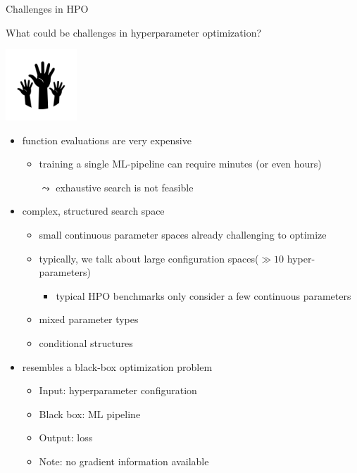 \begin{frame}[c]{Challenges in HPO}
{%
	\centering
	
	\vspace*{2.25cm}
	
	What could be challenges in hyperparameter optimization?
	
	\bigskip
	
	\includegraphics[width=0.2\textwidth]{images/hands.png}
}%
\pause
\begin{itemize}
  \item function evaluations are very expensive
  \begin{itemize}
    \item training a single ML-pipeline can require minutes (or even hours) 
    \item[$\leadsto$] exhaustive search is not feasible
  \end{itemize}
  \pause
  \medskip
  \item complex, structured search space
  \begin{itemize}
    \item small continuous parameter spaces already challenging to optimize
    \item typically, we talk about large configuration spaces\newline ($\gg 10$ hyper-parameters)
    \begin{itemize}
      \item typical HPO benchmarks only consider a few continuous parameters
    \end{itemize}
    \item mixed parameter types
    \item conditional structures
  \end{itemize}
  \pause
  \medskip
  \item resembles a black-box optimization problem
  \begin{itemize}
    \item Input: hyperparameter configuration
    \item Black box: ML pipeline 
    \item Output: loss
    \item Note: no gradient information available
  \end{itemize}
\end{itemize}

\end{frame}
